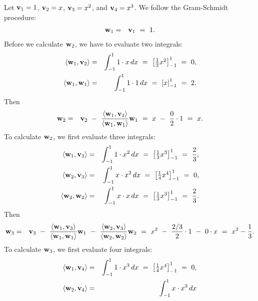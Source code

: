 \begin{solution}
  Let $\vect{v}_1=1$, $\vect{v}_2=x$, $\vect{v}_3=x^2$, and
  $\vect{v}_4=x^3$. We follow the Gram-Schmidt procedure:
  \begin{eqnarray*}
    \vect{w}_1
    &=& \vect{v}_1
        ~=~ 1.
  \end{eqnarray*}
  Before we calculate $\vect{w}_2$, we have to evaluate two integrals:
  \begin{eqnarray*}
    \iprod{\vect{w}_1,\vect{v}_2}
    &=& \int_{-1}^{1} 1\cdot x\,dx
    ~=~ \bigbracket{\textstyle\frac{1}{2}x^2}_{-1}^{1}
    ~=~ 0,
    \\
    \iprod{\vect{w}_1,\vect{w}_1}
    &=& \int_{-1}^{1} 1\cdot 1\,dx
    ~=~ \bigbracket{x}_{-1}^{1}
    ~=~ 2.
  \end{eqnarray*}
  Then
  \begin{eqnarray*}
    \vect{w}_2
    &=& \vect{v}_2 ~-~ \frac{\iprod{\vect{w}_1,\vect{v}_2}}{\iprod{\vect{w}_1,\vect{w}_1}}\vect{w}_1
    ~=~ x ~-~ \frac{0}{2}\cdot 1 ~=~ x.
  \end{eqnarray*}
  To calculate $\vect{w}_2$, we first evaluate three integrals:
  \begin{eqnarray*}
    \iprod{\vect{w}_1,\vect{v}_3}
    &=& \int_{-1}^{1} 1\cdot x^2\,dx
    ~=~ \bigbracket{\textstyle\frac{1}{3}x^3}_{-1}^{1}
    ~=~ \frac{2}{3},
    \\
    \iprod{\vect{w}_2,\vect{v}_3}
    &=& \int_{-1}^{1} x\cdot x^2\,dx
    ~=~ \bigbracket{\textstyle\frac{1}{4}x^4}_{-1}^{1}
    ~=~ 0,
    \\
    \iprod{\vect{w}_2,\vect{w}_2}
    &=& \int_{-1}^{1} x\cdot x\,dx
    ~=~ \bigbracket{\textstyle\frac{1}{3}x^3}_{-1}^{1}
    ~=~ \frac{2}{3}.
  \end{eqnarray*}
  Then
  \begin{eqnarray*}
    \vect{w}_3
    &=& \vect{v}_3
        ~-~ \frac{\iprod{\vect{w}_1,\vect{v}_3}}{\iprod{\vect{w}_1,\vect{w}_1}}\vect{w}_1
        ~-~ \frac{\iprod{\vect{w}_2,\vect{v}_3}}{\iprod{\vect{w}_2,\vect{w}_2}}\vect{w}_2
        ~=~ x^2 ~-~ \frac{2/3}{2}\cdot 1 ~-~ 0\cdot x
        ~=~ x^2 - \frac{1}{3}.
  \end{eqnarray*}
  To calculate $\vect{w}_3$, we first evaluate four integrals:
  \begin{eqnarray*}
    \iprod{\vect{w}_1,\vect{v}_4}
    &=& \int_{-1}^{1} 1\cdot x^3\,dx
    ~=~ \bigbracket{\textstyle\frac{1}{4}x^4}_{-1}^{1}
    ~=~ 0,
    \\
    \iprod{\vect{w}_2,\vect{v}_4}
    &=& \int_{-1}^{1} x\cdot x^3\,dx

\end{eqnarray*}
\end{solution}
